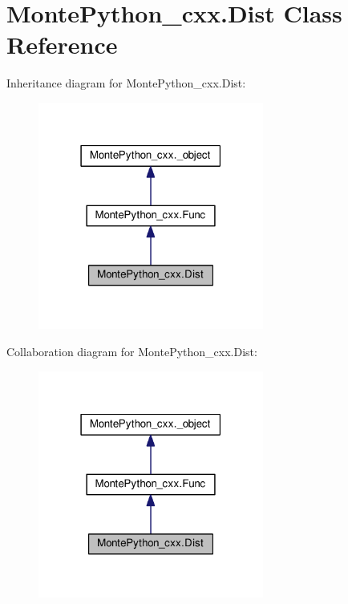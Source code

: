 \hypertarget{classMontePython__cxx_1_1Dist}{}\section{Monte\+Python\+\_\+cxx.\+Dist Class Reference}
\label{classMontePython__cxx_1_1Dist}


Inheritance diagram for Monte\+Python\+\_\+cxx.\+Dist\+:
\nopagebreak
\begin{figure}[H]
\begin{center}
\leavevmode
\includegraphics[width=210pt]{classMontePython__cxx_1_1Dist__inherit__graph}
\end{center}
\end{figure}


Collaboration diagram for Monte\+Python\+\_\+cxx.\+Dist\+:
\nopagebreak
\begin{figure}[H]
\begin{center}
\leavevmode
\includegraphics[width=210pt]{classMontePython__cxx_1_1Dist__coll__graph}
\end{center}
\end{figure}
